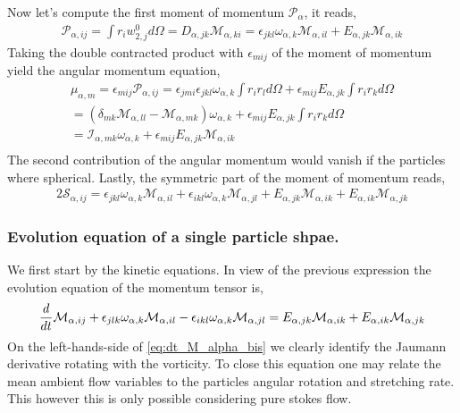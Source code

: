 Now let's compute the first moment of momentum $\mathcal{P}_\alpha$, it reads, 
\begin{align*}
    \mathcal{P}_{\alpha,ij}
    = \int r_i w_{2,j}^0 d\Omega
    = D_{\alpha,jk} \mathcal{M}_{\alpha,ki}
    = \epsilon_{jkl} \omega_{\alpha,k} \mathcal{M}_{\alpha,il}
    +  E_{\alpha,jk} \mathcal{M}_{\alpha,ik}
\end{align*}
Taking the double contracted product with $\epsilon_{mij}$ of the moment of momentum yield the angular momentum equation, 
\begin{align*}
    \mu_{\alpha,m}
    = \epsilon_{mij}\mathcal{P}_{\alpha,ij}
    = \epsilon_{jmi} \epsilon_{jkl} \omega_{\alpha,k} \int r_i r_l  d\Omega
    +  \epsilon_{mij} E_{\alpha,jk} \int r_i r_k  d\Omega\\
    = (\delta_{mk}\mathcal{M}_{\alpha,ll} - \mathcal{M}_{\alpha,mk}) \omega_{\alpha,k}
    +  \epsilon_{mij} E_{\alpha,jk} \int r_i r_k  d\Omega\\
    = \mathcal{I}_{\alpha,mk} \omega_{\alpha,k}
    +  \epsilon_{mij} E_{\alpha,jk} \mathcal{M}_{\alpha,ik}\\
\end{align*}
The second contribution of the angular momentum would vanish if the particles where spherical. 
Lastly, the symmetric part of the moment of momentum reads, 
\begin{align*}
    2\mathcal{S}_{\alpha,ij}
    = \epsilon_{jkl} \omega_{\alpha,k} \mathcal{M}_{\alpha,il}
    + \epsilon_{ikl} \omega_{\alpha,k} \mathcal{M}_{\alpha,jl}
    +  E_{\alpha,jk} \mathcal{M}_{\alpha,ik}
    +  E_{\alpha,ik}  \mathcal{M}_{\alpha,jk}
\end{align*}

\subsubsection*{Evolution equation of a single particle shpae.}

We first start by the kinetic equations.  
In view of the previous expression the evolution equation of the momentum tensor is,  
\begin{equation*}
    \frac{d}{d t} \mathcal{M}_{\alpha,ij}
    + \epsilon_{jlk} \omega_{\alpha,k} \mathcal{M}_{\alpha,il}
    - \epsilon_{ikl} \omega_{\alpha,k} \mathcal{M}_{\alpha,jl}
     =  E_{\alpha,jk} \mathcal{M}_{\alpha,ik}
     +  E_{\alpha,ik}  \mathcal{M}_{\alpha,jk}
     \label{eq:dt_M_alpha_bis}
\end{equation*}
On the left-hands-side of \ref{eq:dt_M_alpha_bis} we clearly identify the Jaumann derivative rotating with the vorticity.
To close this equation one may relate the mean ambient flow variables to the particles angular rotation and stretching rate. 
This however this is only possible considering pure stokes flow.

